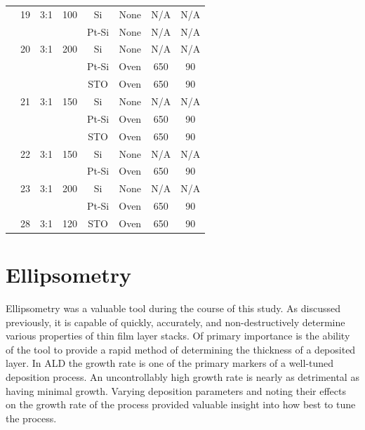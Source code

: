 {\begin{longtable}{cccccccc}
		&19		&3:1		&100	&Si		&None 	&N/A		&N/A		\\
		&		&		&		&Pt-Si	&None 	&N/A		&N/A		\\
		&20		&3:1		&200	&Si		&None 	&N/A		&N/A		\\
		&		&		&		&Pt-Si	&Oven	&650	&90		\\
		&		&		&		&STO	&Oven	&650	&90		\\
		&21		&3:1		&150	&Si		&None 	&N/A		&N/A		\\
		&		&		&		&Pt-Si	&Oven	&650	&90		\\
		&		&		&		&STO	&Oven	&650	&90		\\
		&22		&3:1		&150	&Si		&None 	&N/A		&N/A		\\
		&		&		&		&Pt-Si	&Oven	&650	&90		\\
		&23		&3:1		&200	&Si		&None 	&N/A		&N/A		\\
		&		&		&		&Pt-Si	&Oven	&650	&90		\\
		&28		&3:1		&120	&STO	&Oven	&650	&90		\\
	\bottomrule
\end{longtable}}


\section{Ellipsometry}
\label{chap:Results-Ellipsometry}

Ellipsometry was a valuable tool during the course of this study. As discussed previously, it is capable of quickly, accurately, and non-destructively determine various properties of thin film layer stacks. Of primary importance is the ability of the tool to provide a rapid method of determining the thickness of a deposited layer. In ALD the growth rate is one of the primary markers of a well-tuned deposition process. An uncontrollably high growth rate is nearly as detrimental as having minimal growth. Varying deposition parameters and noting their effects on the growth rate of the process provided valuable insight into how best to tune the process. 

